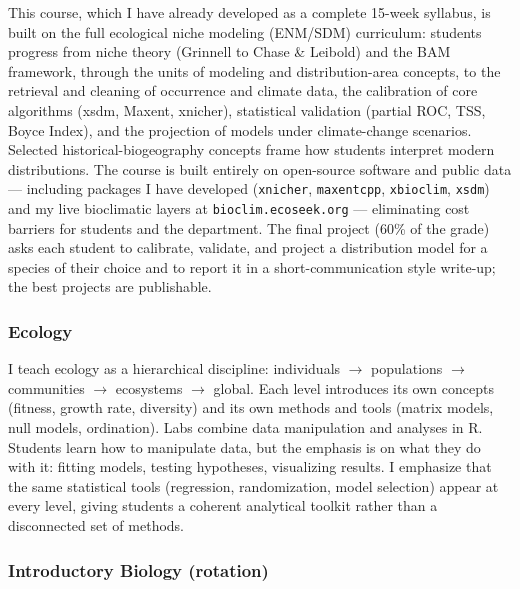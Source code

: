 \documentclass[11pt,letterpaper]{article}
\begin{document}
This course, which I have already developed as a complete 15-week
syllabus, is built on the full ecological niche
modeling (ENM/SDM) curriculum: students progress from niche theory
(Grinnell to Chase \& Leibold) and the BAM framework, through the units
of modeling and distribution-area concepts, to the retrieval and
cleaning of occurrence and climate data, the calibration of core
algorithms (xsdm, Maxent, xnicher), statistical validation (partial ROC, TSS, Boyce Index), and the projection of models under climate-change scenarios.
Selected historical-biogeography concepts  frame how students
interpret modern distributions. The course is built entirely on
open-source software and public data --- including packages I have
developed (\texttt{xnicher}, \texttt{maxentcpp}, \texttt{xbioclim},
\texttt{xsdm}) and my live bioclimatic layers at
\texttt{bioclim.ecoseek.org} --- eliminating cost barriers for students
and the department. The final project (60\% of the grade) asks each
student to calibrate, validate, and project a distribution model for a
species of their choice and to report it in a short-communication style
write-up; the best projects are publishable.

\subsubsection*{Ecology}\label{ecology}

I teach ecology as a hierarchical discipline: individuals \ensuremath{\rightarrow}  populations
\ensuremath{\rightarrow}  communities \ensuremath{\rightarrow}  ecosystems \ensuremath{\rightarrow}  global. Each level introduces its own concepts (fitness, growth rate, diversity) and its own methods and tools (matrix models, null models, ordination). Labs combine data manipulation and analyses in R. Students learn how to manipulate data, but the emphasis is on what they do with it: fitting models, testing hypotheses, visualizing results. I emphasize that the same statistical tools (regression, randomization, model selection) appear at every level, giving students a coherent analytical toolkit rather than a disconnected set of methods.


\subsubsection*{Introductory Biology
(rotation)}\label{introductory-biology-rotation}
\end{document}

